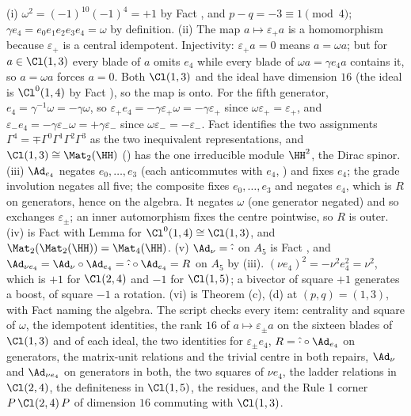 (i) $\omega^2 = (-1)^{10}(-1)^4 = +1$ by Fact , and $p - q = -3 \equiv 1 \pmod 4$; $\gamma e_4 = e_0e_1e_2e_3e_4 = \omega$ by definition. (ii) The map $a \mapsto \varepsilon_+ a$ is a homomorphism because $\varepsilon_+$ is a central idempotent. Injectivity: $\varepsilon_+ a = 0$ means $a = \omega a$; but for $a \in \Cl(1,3)$ every blade of $a$ omits $e_4$ while every blade of $\omega a = \gamma e_4 a$ contains it, so $a = \omega a$ forces $a = 0$. Both $\Cl(1,3)$ and the ideal have dimension $16$ (the ideal is $\Cl^0(1,4)$ by Fact ), so the map is onto. For the fifth generator, $e_4 = \gamma^{-1}\omega = -\gamma\omega$, so $\varepsilon_+ e_4 = -\gamma\varepsilon_+\omega = -\gamma\varepsilon_+$ since $\omega\varepsilon_+ = \varepsilon_+$, and $\varepsilon_- e_4 = -\gamma\varepsilon_-\omega = +\gamma\varepsilon_-$ since $\omega\varepsilon_- = -\varepsilon_-$. Fact  identifies the two assignments $\Gamma^4 = \mp\Gamma^0\Gamma^1\Gamma^2\Gamma^3$ as the two inequivalent representations, and $\Cl(1,3) \cong \Mat_2(\HH)$ () has the one irreducible module $\HH^2$, the Dirac spinor. (iii) $\Ad_{e_4}$ negates $e_0, \ldots, e_3$ (each anticommutes with $e_4$, ) and fixes $e_4$; the grade involution negates all five; the composite fixes $e_0, \ldots, e_3$ and negates $e_4$, which is $R$ on generators, hence on the algebra. It negates $\omega$ (one generator negated) and so exchanges $\varepsilon_\pm$; an inner automorphism fixes the centre pointwise, so $R$ is outer. (iv) is Fact  with Lemma  for $\Cl^0(1,4) \cong \Cl(1,3)$, and $\Mat_2(\Mat_2(\HH)) = \Mat_4(\HH)$. (v) $\Ad_\nu = \hat{\cdot}$ on $A_5$ is Fact , and $\Ad_{\nu e_4} = \Ad_\nu \circ \Ad_{e_4} = \hat{\cdot} \circ \Ad_{e_4} = R$ on $A_5$ by (iii). $(\nu e_4)^2 = -\nu^2 e_4^2 = \nu^2$, which is $+1$ for $\Cl(2,4)$ and $-1$ for $\Cl(1,5)$; a bivector of square $+1$ generates a boost, of square $-1$ a rotation. (vi) is Theorem (c), (d) at $(p,q) = (1,3)$, with Fact  naming the algebra. The script checks every item: centrality and square of $\omega$, the idempotent identities, the rank $16$ of $a \mapsto \varepsilon_\pm a$ on the sixteen blades of $\Cl(1,3)$ and of each ideal, the two identities for $\varepsilon_\pm e_4$, $R = \hat{\cdot} \circ \Ad_{e_4}$ on generators, the matrix-unit relations and the trivial centre in both repairs, $\Ad_\nu$ and $\Ad_{\nu e_4}$ on generators in both, the two squares of $\nu e_4$, the ladder relations in $\Cl(2,4)$, the definiteness in $\Cl(1,5)$, the residues, and the Rule 1 corner $P\,\Cl(2,4)\,P$ of dimension $16$ commuting with $\Cl(1,3)$.
